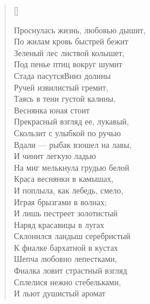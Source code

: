 \settowidth{\versewidth}{Проснулась жизнь, любовью дышит,}
\begin{verse}[\versewidth]
\begin{altverse}
Проснулась жизнь, любовью дышит,\\
    По жилам кровь быстрей бежит\ldotst\\
Зеленый лес листвой колышет,\\
    Под пенье птиц вокруг шумит\ldotst\\
Стада пасутся\ldotst Вниз долины\\
    Ручей извилистый гремит,\\
Таясь в тени густой калины,\\
     Веснянка юная стоит\ldotst\\
Прекрасный взгляд ее, лукавый,\\
    Скользит с улыбкой по ручью\ldotst\\
Вдали --- рыбак взошел на лавы,\\
    И чинит легкую ладью\ldotst\\
На миг мелькнула грудью белой\\
    Краса веснянки в камышах,\\
И поплыла, как лебедь, смело,\\
    Играя брызгами в волнах;\\
И лишь пестреет золотистый\\
    Наряд красавицы в лугах\ldotst\\
Склонился ландыш серебристый\\
    К фиалке бархатной в кустах\ldotst\\
Шепча любовно лепестками,\\
    Фиалка ловит страстный взгляд\ldotst\\
Сплелися нежно стебельками,\\
    И льют душистый аромат\ldotst
\end{altverse}
\end{verse}



